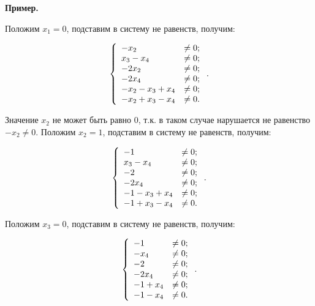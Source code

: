 \documentclass[14pt]{mmcs-article}
\begin{document}
\textbf{Пример.}

Положим $x_1 = 0$, подставим в систему не равенств, получим:

\begin{equation}
    \centering
    \left\{
        \begin{array}{ll}
            - x_2 &\neq 0            ; \\
            x_3 - x_4 &\neq 0        ; \\
            - 2 x_2 &\neq 0          ; \\
            - 2 x_4 &\neq 0          ; \\
            - x_2 - x_3 + x_4 &\neq 0; \\
            - x_2 + x_3 - x_4 &\neq 0. \\
        \end{array}
    \right..
    \label{eqs:cycle_search_neqs}
\end{equation}

Значение $x_2$ не может быть равно $0$, т.к. в таком случае нарушается не равенство $- x_2 \neq 0$. Положим $x_2 = 1$, подставим в систему не равенств, получим:

\begin{equation}
    \centering
    \left\{
        \begin{array}{ll}
            - 1 &\neq 0             ; \\
            x_3 - x_4 &\neq 0       ; \\
            - 2 &\neq 0             ; \\
            - 2 x_4 &\neq 0         ; \\
            - 1 - x_3 + x_4 &\neq 0 ; \\
            - 1 + x_3 - x_4 &\neq 0 . \\
        \end{array}
    \right..
    \label{eqs:cycle_search_neqs}
\end{equation}

Положим $x_3 = 0$, подставим в систему не равенств, получим:

\begin{equation}
    \centering
    \left\{
        \begin{array}{ll}
            - 1 &\neq 0       ; \\
            - x_4 &\neq 0     ; \\
            - 2 &\neq 0       ; \\
            - 2 x_4 &\neq 0   ; \\
            - 1 + x_4 &\neq 0 ; \\
            - 1 - x_4 &\neq 0 . \\
        \end{array}
    \right..
    \label{eqs:cycle_search_neqs}
\end{equation}
\end{document}
